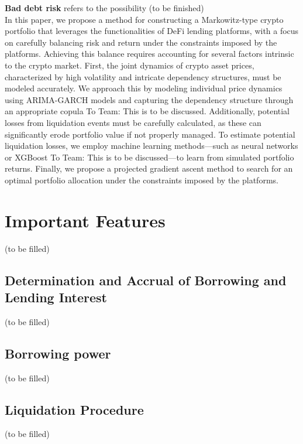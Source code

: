 \documentclass{article} %
\providecommand{\red}[1]{\textcolor{BrickRed}{#1}}
\theoremstyle{plain}
\theoremstyle{definition} %
\begin{document}
{\bf Bad debt risk} refers to the possibility (to be finished)\\%

In this paper, we propose a method for constructing a Markowitz-type crypto portfolio that leverages the functionalities of DeFi lending platforms, 
 with a focus on carefully balancing risk and return under the constraints imposed by the platforms. 
 Achieving this balance requires accounting for several factors intrinsic to the crypto market. 
 First, the joint dynamics of crypto asset prices, characterized by high volatility and intricate dependency structures, must be modeled accurately. 
 We approach this by modeling individual price dynamics using ARIMA-GARCH models and capturing the dependency structure through an appropriate copula {\red{To Team: This is to be discussed}}.
 Additionally, potential losses from liquidation events must be carefully calculated, as these can significantly erode portfolio value if not properly managed.
 To estimate potential liquidation losses, we employ machine learning methods—such as neural networks or XGBoost {\red{To Team: This is to be discussed}}—to learn from simulated portfolio returns.
 Finally, we propose a projected gradient ascent method to search for an optimal portfolio allocation under the constraints imposed by the platforms. 


\section{Important Features}
(to be filled)
\subsection{Determination and Accrual of Borrowing and Lending Interest}
(to be filled)
\subsection{Borrowing power}
(to be filled)
\subsection{Liquidation Procedure}
(to be filled)
\end{document}
